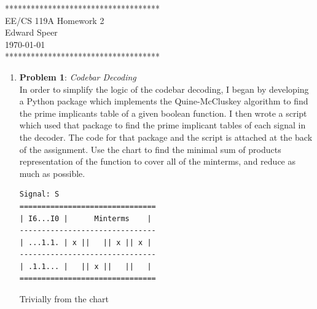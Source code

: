 \documentclass{article}
\newcommand{\HWNUM}{2}
\begin{document}

    \begin{center}
        ************************************ \\
        EE/CS 119A Homework \HWNUM \\
        Edward Speer \\
        \today \\
        ************************************
    \end{center}

    \begin{enumerate}
    
        \item \textbf{Problem 1}: \emph{Codebar Decoding} \\
        
            In order to simplify the logic of the codebar decoding, I began by
            developing a Python package which implements the Quine-McCluskey
            algorithm to find the prime implicants table of a given boolean
            function. I then wrote a script which used that package to find the
            prime implicant tables of each signal in the decoder. The code for
            that package and the script is attached at the back of the
            assignment. Use the chart to find the minimal sum of products
            representation of the function to cover all of the minterms, and
            reduce as much as possible.

            \begin{scriptsize}
                \begin{verbatim}
Signal: S
===============================
| I6...I0 |      Minterms    |
-------------------------------
| ...1.1. | x ||   || x || x |
-------------------------------
| .1.1... |   || x ||   ||   |
===============================
                \end{verbatim}
            \end{scriptsize}

            Trivially from the chart 


\end{enumerate}
\end{document}
